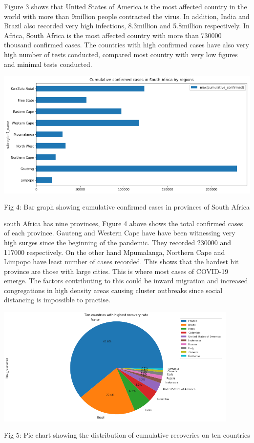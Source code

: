 \documentclass[12pt]{article}
\begin{document}
Figure 3 shows that United States of America is the most affected country in the world with more than 9million people contracted the virus. In addition, India and Brazil also recorded very high infections, 8.3million and 5.8million respectively. In Africa, South Africa is the most affected country with more than 730000 thousand confirmed cases. The countries with high confirmed cases have also very high number of tests conducted, compared most country with very low figures and minimal tests conducted. 


\includegraphics[width=0.9\linewidth, inner]{bar2.png}
\caption{Fig 4: Bar graph showing cumulative confirmed cases in provinces of South Africa}

south Africa has nine provinces, Figure 4 above shows the total confirmed cases of each province. Gauteng and Western Cape have have been witnessing very high surges since the beginning of the pandemic. They recorded 230000 and 117000 respectively. On the other hand Mpumalanga, Northern Cape and Limpopo have least number of cases recorded. This shows that the hardest hit province are those with large cities. This is where most cases  of COVID-19 emerge. The factors contributing to this could be inward migration and increased congregations in high density areas causing cluster outbreaks since social distancing is impossible to practise. 

\centering
\includegraphics[width=0.9\textwidth, inner]{pie1.png}
\caption{Fig 5: Pie chart showing the distribution of cumulative recoveries on ten countries}
\end{document}

